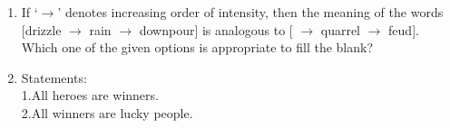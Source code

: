 \documentclass[journal]{IEEEtran}
\begin{document}
\begin{enumerate}[leftmargin=0pt]
\item If `$\to$' denotes increasing order of intensity, then the meaning of the words [drizzle $\to$ rain $\to$ downpour] is analogous to [ \underline{\hspace{1.5cm}} $\to$ quarrel $\to$ feud]. Which one of the given options is appropriate to fill the blank?
\begin{enumerate}
\end{enumerate}
\hfill{}
\item Statements:\\[0.5em]

1.All heroes are winners.\\
2.All winners are lucky people.\\


\end{enumerate}
\end{document}
